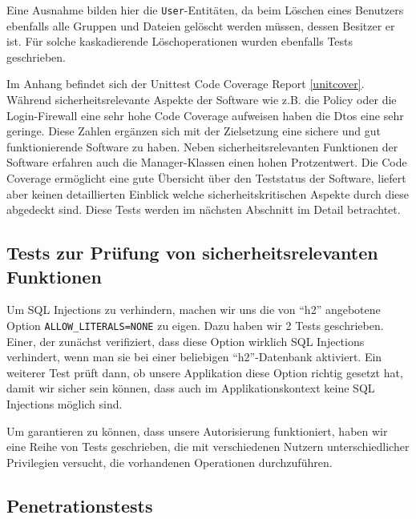 \documentclass[12pt,DIV14,BCOR10mm,a4paper,parskip=half-,headsepline,headinclude,english,ngerman,bibliography=totocnumbered]{scrreprt}
\begin{document}
Eine Ausnahme bilden hier die \texttt{User}-Entitäten, da beim Löschen eines Benutzers ebenfalls alle Gruppen und Dateien gelöscht werden müssen, dessen Besitzer er ist. Für solche kaskadierende Löschoperationen wurden ebenfalls Tests geschrieben.

Im Anhang befindet sich der Unittest Code Coverage Report \ref{unitcover}. Während sicherheitsrelevante Aspekte der Software wie z.B. die Policy oder die Login-Firewall eine sehr hohe Code Coverage aufweisen haben die Dtos eine sehr geringe. Diese Zahlen ergänzen sich mit der Zielsetzung eine sichere und gut funktionierende Software zu haben. Neben sicherheitsrelevanten Funktionen der Software erfahren auch die Manager-Klassen einen hohen Protzentwert. Die Code Coverage ermöglicht eine gute Übersicht über den Teststatus der Software, liefert aber keinen detaillierten Einblick welche sicherheitskritischen Aspekte durch diese abgedeckt sind. Diese Tests werden im nächsten Abschnitt im Detail betrachtet.

\subsection{Tests zur Prüfung von sicherheitsrelevanten Funktionen}

Um SQL Injections zu verhindern, machen wir uns die von \enquote{h2} angebotene Option \texttt{ALLOW\_LITERALS=NONE} zu eigen.
Dazu haben wir 2 Tests geschrieben.
Einer, der zunächst verifiziert, dass diese Option wirklich SQL Injections verhindert, wenn man sie bei einer beliebigen \enquote{h2}-Datenbank aktiviert.
Ein weiterer Test prüft dann, ob unsere Applikation diese Option richtig gesetzt hat, damit wir sicher sein können, dass auch im Applikationskontext keine SQL Injections möglich sind.

Um garantieren zu können, dass unsere Autorisierung funktioniert, haben wir eine Reihe von Tests geschrieben, die mit verschiedenen Nutzern unterschiedlicher Privilegien versucht, die vorhandenen Operationen durchzuführen.

\subsection{Penetrationstests}
\end{document}
